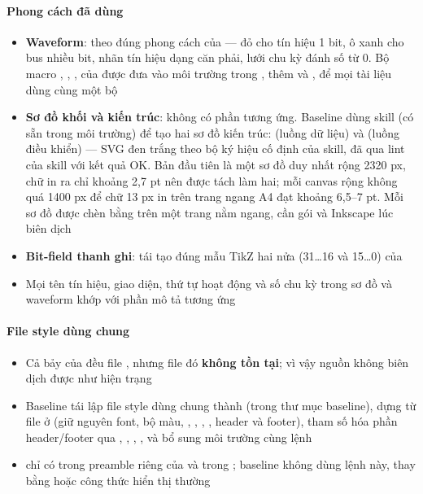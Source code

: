 \documentclass[10pt,a4paper]{article}
\begin{document}
\paragraph{Phong cách đã dùng}\label{par:5-2}
\begin{itemize}
\item \textbf{Waveform}: theo đúng phong cách  của  — đỏ  cho tín hiệu 1 bit, ô xanh  cho bus nhiều bit, nhãn tín hiệu dạng  căn phải, lưới chu kỳ đánh số từ 0. Bộ macro , , ,  của  được đưa vào môi trường  trong , thêm  và , để mọi tài liệu dùng cùng một bộ
\item \textbf{Sơ đồ khối và kiến trúc}:  không có phần tương ứng. Baseline dùng skill  (có sẵn trong môi trường) để tạo hai sơ đồ kiến trúc:  (luồng dữ liệu) và  (luồng điều khiển) — SVG đen trắng theo bộ ký hiệu cố định của skill, đã qua lint của skill với kết quả OK. Bản đầu tiên là một sơ đồ duy nhất rộng 2320 px, chữ in ra chỉ khoảng 2,7 pt nên được tách làm hai; mỗi canvas rộng không quá 1400 px để chữ 13 px in trên trang ngang A4 đạt khoảng 6,5–7 pt. Mỗi sơ đồ được chèn bằng  trên một trang nằm ngang, cần gói  và Inkscape lúc biên dịch
\item \textbf{Bit-field thanh ghi}: tái tạo đúng mẫu TikZ hai nửa (31…16 và 15…0) của 
\item Mọi tên tín hiệu, giao diện, thứ tự hoạt động và số chu kỳ trong sơ đồ và waveform khớp với phần mô tả tương ứng
\end{itemize}

\paragraph{File style dùng chung}\label{par:5-3}
\begin{itemize}
\item Cả bảy  của  đều  file , nhưng file đó \textbf{không tồn tại}; vì vậy nguồn  không biên dịch được như hiện trạng
\item Baseline tái lập file style dùng chung thành  (trong thư mục baseline), dựng từ file  ở  (giữ nguyên font, bộ màu, , , , , header và footer), tham số hóa phần header/footer qua , , , , và bổ sung môi trường  cùng lệnh 
\item {} chỉ có trong preamble riêng của  và  trong ; baseline không dùng lệnh này, thay bằng  hoặc công thức hiển thị thường
\end{itemize}
\end{document}
